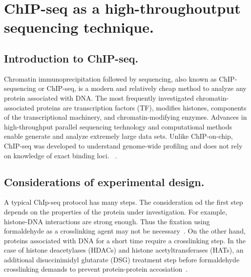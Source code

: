 \chapter{ChIP-seq as a high-throughoutput sequencing technique.}

\section{Introduction to ChIP-seq.}

Chromatin immunoprecipitation followed by sequencing, also known as ChIP-sequencing or ChIP-seq, is a modern and relatively cheap method to analyze any protein associated with DNA. 
The most frequently investigated chromatin-associated proteins are transcription factors (TF), modifies histones, components of the transcriptional machinery, and chromatin-modifying enzymes.
Advances in high-throughput parallel sequencing technology and computational methods enable generate and analyze extremely large data sets. 
Unlike ChIP-on-chip, ChIP-seq was developed to understand genome-wide profiling and does not rely on knowledge of exact binding loci.~\cite{park2009chip} .

\section{Considerations of experimental design.}

A typical ChIp-seq protocol has many steps. 
The consideration od the first step depends on the properties of the protein under investigation. 
For example, histone-DNA interactions are strong enough. 
Thus the fixation using formaldehyde as a crosslinking agent may not be necessary~\cite{barski2008identification}. 
On the other hand, proteins associated with DNA for a short time require a crosslinking step. 
In the case of histone deacetylases (HDACs) and histone acetyltransferases (HATs), an additional disuccinimidyl glutarate (DSG) treatment step before formaldehyde crosslinking demands to prevent protein-protein accosiation~\cite{wang2009genome}. 

